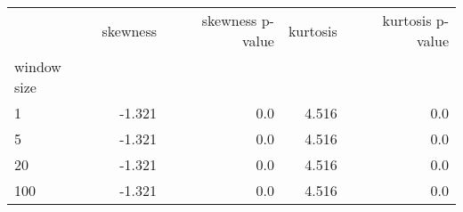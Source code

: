 \begin{tabular}{lrrrr}
\toprule
{} &  skewness &  skewness p-value &  kurtosis &  kurtosis p-value \\
window size &           &                   &           &                   \\
\midrule
1           &    -1.321 &               0.0 &     4.516 &               0.0 \\
5           &    -1.321 &               0.0 &     4.516 &               0.0 \\
20          &    -1.321 &               0.0 &     4.516 &               0.0 \\
100         &    -1.321 &               0.0 &     4.516 &               0.0 \\
\bottomrule
\end{tabular}
